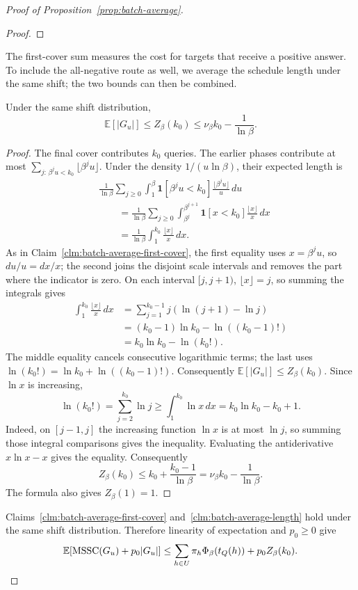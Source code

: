 \begin{proof}[Proof of Proposition~\ref{prop:batch-average}]
\begin{proof}
\end{proof}

The first-cover sum measures the cost for targets that receive a
positive answer. To include the all-negative route as well, we average
the schedule length under the same shift; the two bounds can then be
combined.

\begin{claim}
\label{clm:batch-average-length}
Under the same shift distribution,
\[
 \mathbb E[|G_u|]\le Z_\beta(k_0)
 \le\nu_\beta k_0-\frac1{\ln\beta}.
\]
\end{claim}
\begin{proof}
The final cover contributes $k_0$ queries. The earlier phases
contribute at most
$\sum_{j:\,\beta^ju<k_0}\lfloor\beta^ju\rfloor$.
Under the density $1/(u\ln\beta)$, their expected length is
\[
\begin{aligned}
 &\frac1{\ln\beta}\sum_{j\ge0}\int_1^\beta
       \mathbf1[\beta^ju<k_0]\frac{\lfloor\beta^ju\rfloor}{u}\,du\\
 &\qquad=\frac1{\ln\beta}\sum_{j\ge0}
       \int_{\beta^j}^{\beta^{j+1}}
       \mathbf1[x<k_0]\frac{\lfloor x\rfloor}{x}\,dx\\
 &\qquad=\frac1{\ln\beta}\int_1^{k_0}\frac{\lfloor x\rfloor}{x}\,dx.
\end{aligned}
\]
As in Claim~\ref{clm:batch-average-first-cover}, the first
equality uses $x=\beta^ju$, so $du/u=dx/x$; the second joins
the disjoint scale intervals and removes the part where the
indicator is zero.
On each interval $[j,j+1)$, $\lfloor x\rfloor=j$, so summing the
integrals gives
\[
\begin{aligned}
 \int_1^{k_0}\frac{\lfloor x\rfloor}{x}\,dx
 &=\sum_{j=1}^{k_0-1}j(\ln(j+1)-\ln j)\\
 &=(k_0-1)\ln k_0-\ln((k_0-1)!)\\
 &=k_0\ln k_0-\ln(k_0!).
\end{aligned}
\]
The middle equality cancels consecutive logarithmic terms;
the last uses $\ln(k_0!)=\ln k_0+\ln((k_0-1)!)$.
Consequently $\mathbb E[|G_u|]\le Z_\beta(k_0)$. Since $\ln x$
is increasing,
\[
 \ln(k_0!)=\sum_{j=2}^{k_0}\ln j
 \ge\int_1^{k_0}\ln x\,dx
 =k_0\ln k_0-k_0+1.
\]
Indeed, on $[j-1,j]$ the increasing function $\ln x$ is at
most $\ln j$, so summing those integral comparisons gives
the inequality. Evaluating the antiderivative $x\ln x-x$
gives the equality.
Consequently
\[
 Z_\beta(k_0)
 \le k_0+\frac{k_0-1}{\ln\beta}
 =\nu_\beta k_0-\frac1{\ln\beta}.
\]
The formula also gives
$Z_\beta(1)=1$.
\end{proof}

Claims~\ref{clm:batch-average-first-cover}
and~\ref{clm:batch-average-length} hold under the same shift
distribution. Therefore linearity of expectation and $p_0\ge0$ give
\[
 \mathbb E[\operatorname{MSSC}(G_u)+p_0|G_u|]
 \le\sum_{h\in U}\pi_h\Phi_\beta(t_Q(h))
      +p_0Z_\beta(k_0).
\]

\end{proof}

